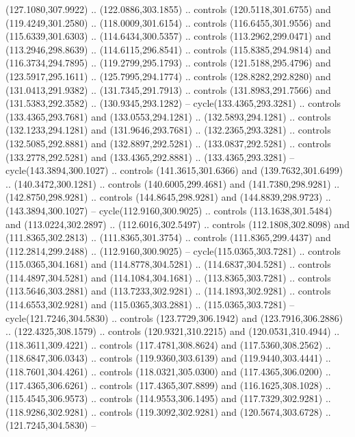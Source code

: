 \begin{scope}[cm={{1.25,0.0,0.0,-1.25,(0.0,743.43331)}}]
    (127.1080,307.9922) .. (122.0886,303.1855) .. controls (120.5118,301.6755) and
    (119.4249,301.2580) .. (118.0009,301.6154) .. controls (116.6455,301.9556) and
    (115.6339,301.6303) .. (114.6434,300.5357) .. controls (113.2962,299.0471) and
    (113.2946,298.8639) .. (114.6115,296.8541) .. controls (115.8385,294.9814) and
    (116.3734,294.7895) .. (119.2799,295.1793) .. controls (121.5188,295.4796) and
    (123.5917,295.1611) .. (125.7995,294.1774) .. controls (128.8282,292.8280) and
    (131.0413,291.9382) .. (131.7345,291.7913) .. controls (131.8983,291.7566) and
    (131.5383,292.3582) .. (130.9345,293.1282) -- cycle(133.4365,293.3281) ..
    controls (133.4365,293.7681) and (133.0553,294.1281) .. (132.5893,294.1281) ..
    controls (132.1233,294.1281) and (131.9646,293.7681) .. (132.2365,293.3281) ..
    controls (132.5085,292.8881) and (132.8897,292.5281) .. (133.0837,292.5281) ..
    controls (133.2778,292.5281) and (133.4365,292.8881) .. (133.4365,293.3281) --
    cycle(143.3894,300.1027) .. controls (141.3615,301.6366) and
    (139.7632,301.6499) .. (140.3472,300.1281) .. controls (140.6005,299.4681) and
    (141.7380,298.9281) .. (142.8750,298.9281) .. controls (144.8645,298.9281) and
    (144.8839,298.9723) .. (143.3894,300.1027) -- cycle(112.9160,300.9025) ..
    controls (113.1638,301.5484) and (113.0224,302.2897) .. (112.6016,302.5497) ..
    controls (112.1808,302.8098) and (111.8365,302.2813) .. (111.8365,301.3754) ..
    controls (111.8365,299.4437) and (112.2814,299.2488) .. (112.9160,300.9025) --
    cycle(115.0365,303.7281) .. controls (115.0365,304.1681) and
    (114.8778,304.5281) .. (114.6837,304.5281) .. controls (114.4897,304.5281) and
    (114.1084,304.1681) .. (113.8365,303.7281) .. controls (113.5646,303.2881) and
    (113.7233,302.9281) .. (114.1893,302.9281) .. controls (114.6553,302.9281) and
    (115.0365,303.2881) .. (115.0365,303.7281) -- cycle(121.7246,304.5830) ..
    controls (123.7729,306.1942) and (123.7916,306.2886) .. (122.4325,308.1579) ..
    controls (120.9321,310.2215) and (120.0531,310.4944) .. (118.3611,309.4221) ..
    controls (117.4781,308.8624) and (117.5360,308.2562) .. (118.6847,306.0343) ..
    controls (119.9360,303.6139) and (119.9440,303.4441) .. (118.7601,304.4261) ..
    controls (118.0321,305.0300) and (117.4365,306.0200) .. (117.4365,306.6261) ..
    controls (117.4365,307.8899) and (116.1625,308.1028) .. (115.4545,306.9573) ..
    controls (114.9553,306.1495) and (117.7329,302.9281) .. (118.9286,302.9281) ..
    controls (119.3092,302.9281) and (120.5674,303.6728) .. (121.7245,304.5830) --

\end{scope}
